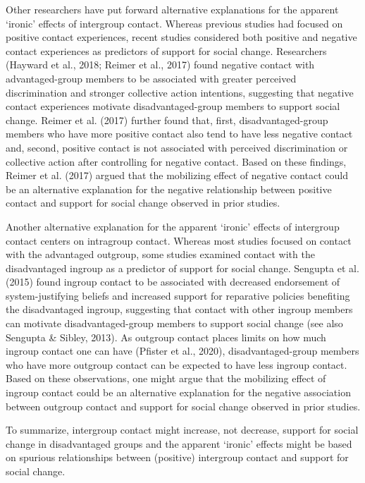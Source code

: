 \documentclass[12pt, letterpaper]{article}
\begin{document}
Other researchers have put forward alternative explanations for the
apparent `ironic' effects of intergroup contact. Whereas previous
studies had focused on positive contact experiences, recent studies
considered both positive and negative contact experiences as predictors
of support for social change. Researchers (Hayward et al., 2018; Reimer
et al., 2017) found negative contact with advantaged-group members to be
associated with greater perceived discrimination and stronger collective
action intentions, suggesting that negative contact experiences motivate
disadvantaged-group members to support social change. Reimer et al.
(2017) further found that, first, disadvantaged-group members who have
more positive contact also tend to have less negative contact and,
second, positive contact is not associated with perceived discrimination
or collective action after controlling for negative contact. Based on
these findings, Reimer et al. (2017) argued that the mobilizing effect
of negative contact could be an alternative explanation for the negative
relationship between positive contact and support for social change
observed in prior studies.

Another alternative explanation for the apparent `ironic' effects of
intergroup contact centers on intragroup contact. Whereas most studies
focused on contact with the advantaged outgroup, some studies examined
contact with the disadvantaged ingroup as a predictor of support for
social change. Sengupta et al. (2015) found ingroup contact to be
associated with decreased endorsement of system-justifying beliefs and
increased support for reparative policies benefiting the disadvantaged
ingroup, suggesting that contact with other ingroup members can motivate
disadvantaged-group members to support social change (see also Sengupta
\& Sibley, 2013). As outgroup contact places limits on how much ingroup
contact one can have (Pfister et al., 2020), disadvantaged-group members
who have more outgroup contact can be expected to have less ingroup
contact. Based on these observations, one might argue that the
mobilizing effect of ingroup contact could be an alternative explanation
for the negative association between outgroup contact and support for
social change observed in prior studies.

To summarize, intergroup contact might increase, not decrease, support
for social change in disadvantaged groups and the apparent `ironic'
effects might be based on spurious relationships between (positive)
intergroup contact and support for social change.
\end{document}
